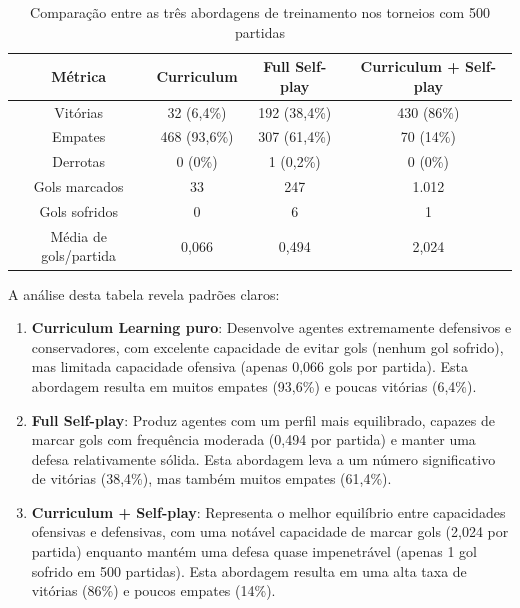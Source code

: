 \begin{table}[H]
    \centering
    \begin{tabular}{|c|c|c|c|}
        \hline
        \textbf{Métrica} & \textbf{Curriculum} & \textbf{Full Self-play} & \textbf{Curriculum + Self-play} \\
        \hline
        Vitórias & 32 (6,4\%) & 192 (38,4\%) & 430 (86\%) \\
        \hline
        Empates & 468 (93,6\%) & 307 (61,4\%) & 70 (14\%) \\
        \hline
        Derrotas & 0 (0\%) & 1 (0,2\%) & 0 (0\%) \\
        \hline
        Gols marcados & 33 & 247 & 1.012 \\
        \hline
        Gols sofridos & 0 & 6 & 1 \\
        \hline
        Média de gols/partida & 0,066 & 0,494 & 2,024 \\
        \hline
    \end{tabular}
    \caption{Comparação entre as três abordagens de treinamento nos torneios com 500 partidas}
    \label{tab:comparacao_abordagens}
\end{table}

A análise desta tabela revela padrões claros:

\begin{enumerate}
    \item \textbf{Curriculum Learning puro}: Desenvolve agentes extremamente defensivos e conservadores, com excelente capacidade de evitar gols (nenhum gol sofrido), mas limitada capacidade ofensiva (apenas 0,066 gols por partida). Esta abordagem resulta em muitos empates (93,6\%) e poucas vitórias (6,4\%).
    
    \item \textbf{Full Self-play}: Produz agentes com um perfil mais equilibrado, capazes de marcar gols com frequência moderada (0,494 por partida) e manter uma defesa relativamente sólida. Esta abordagem leva a um número significativo de vitórias (38,4\%), mas também muitos empates (61,4\%).
    
    \item \textbf{Curriculum + Self-play}: Representa o melhor equilíbrio entre capacidades ofensivas e defensivas, com uma notável capacidade de marcar gols (2,024 por partida) enquanto mantém uma defesa quase impenetrável (apenas 1 gol sofrido em 500 partidas). Esta abordagem resulta em uma alta taxa de vitórias (86\%) e poucos empates (14\%).
\end{enumerate}

